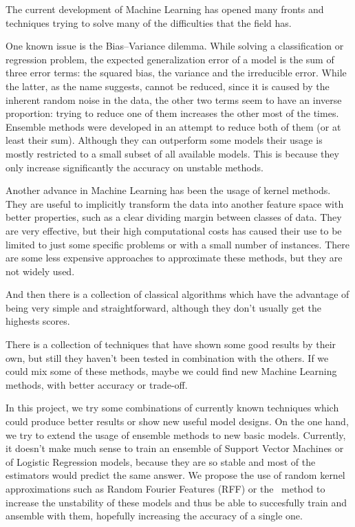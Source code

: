 \begin{pre-delivery}
  The current development of Machine Learning has opened many fronts and
  techniques trying to solve many of the difficulties that the field has.

  One known issue is the Bias--Variance dilemma. While solving a classification
  or regression problem, the expected generalization error of a model is the
  sum of three error terms: the squared bias, the variance and the irreducible error.
  While the latter, as the name suggests, cannot be reduced, since it is
  caused by the inherent random noise in the data, the other two terms seem
  to have an inverse proportion: trying to reduce one of them increases the
  other most of the times.
  Ensemble methods were developed in an attempt to reduce both of them (or at
  least their sum).
  Although they can outperform some models
  their usage is mostly restricted to a small subset of all available models.
  This is because they only increase significantly the accuracy on unstable
  methods.

  Another advance in Machine Learning has been the usage of kernel methods. They
  are useful to implicitly transform the data into another feature space with better properties,
  such as a clear dividing margin between classes of data. They are very
  effective, but their high computational costs has caused their use to be limited to just
  some specific problems or with a small number of instances. There are some
  less expensive approaches to approximate these methods, but they are not
  widely used.

  And then there is a collection of classical algorithms which have the
  advantage of being very simple and straightforward, although they don't
  usually get the highests scores.

  There is a collection of techniques that have shown some good results by their
  own, but still they haven't been tested in combination with the others. If we
  could mix some of these methods, maybe we could find new Machine Learning
  methods, with better accuracy or trade-off.

  In this project, we try some combinations of currently known techniques which
  could produce better results or show new useful model designs. On the one
  hand, we try to extend the usage of ensemble methods to new basic models.
  Currently, it doesn't make much sense to train an ensemble of Support Vector
  Machines or of Logistic Regression models, because they are so stable and
  most of the estimators would predict the same answer. We propose the use of
  random kernel approximations such as Random Fourier Features (RFF) or the
  \Nys\ method to increase the unstability of these models and thus be able to
  succesfully train and ansemble with them, hopefully increasing the accuracy
  of a single one.


\end{pre-delivery}
